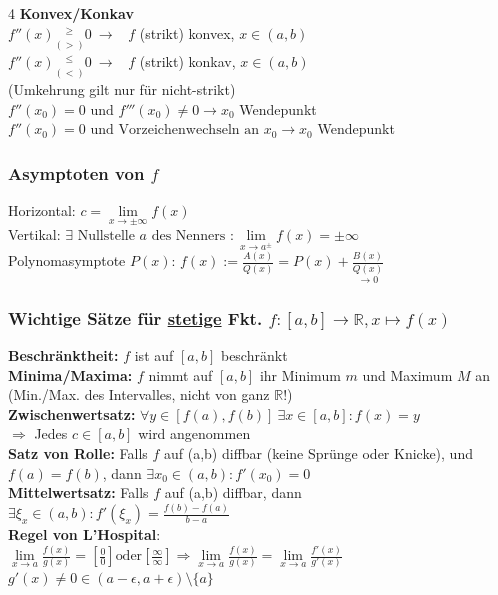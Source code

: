 \documentclass[6pt,a4paper]{scrartcl}
\newcommand{\ra}[0]{\ensuremath{\rightarrow}}
\begin{document}
\begin{multicols*}{4}
	\textbf{Konvex/Konkav} \\
	$f''(x) \underset{(>)}{^{\ge}} 0 \ \rightarrow$ \ $f$ (strikt) konvex, $x\in(a,b)$\\
	$f''(x) \underset{(<)}{^{\le}} 0 \ \rightarrow$ \ $f$ (strikt) konkav, $x\in(a,b)$\\
	(Umkehrung gilt nur für nicht-strikt) \\
	$f''(x_0)=0 \text{ und } f'''(x_0) \ne 0 \rightarrow x_0$ Wendepunkt \\
	$f''(x_0)=0 \text{ und Vorzeichenwechseln an } x_0 \rightarrow x_0$ Wendepunkt

	\subsubsection{Asymptoten von $f$}
	Horizontal: $c=\lim\limits_{x\ra \pm \infty} f(x)$\\
	Vertikal: $\exists \text{ Nullstelle } a \text{ des Nenners }: \lim\limits_{x \rightarrow a^{\pm}} f(x) = \pm \infty$\\
	Polynomasymptote $P(x)$: $f(x):=\frac{A(x)}{Q(x)}=P(x)+ \underset{\ra 0}{\frac{B(x)}{Q(x)}}$

	\begin{sectionbox}
		\subsubsection{Wichtige Sätze für \underline{stetige} Fkt. $f: [a,b] \rightarrow \mathbb R, x \mapsto f(x)$ }
		\textbf{Beschränktheit:} $f$ ist auf $[a,b]$ beschränkt\\
		\textbf{Minima/Maxima:} $f$ nimmt auf $[a,b]$ ihr Minimum $m$ und Maximum $M$ an (Min./Max. des Intervalles, nicht von ganz $\mathbb R$!)\\
		\textbf{Zwischenwertsatz:} $\forall y \in [f(a),f(b)]\ \exists x\in [a,b]:f(x)=y$\\
		$\Longrightarrow$ Jedes $c \in [a,b]$ wird angenommen\\
		\textbf{Satz von Rolle:} Falls $f$ auf (a,b) diffbar (keine Sprünge oder Knicke), und $f(a)=f(b)$, dann $\exists x_0 \in (a,b): f' (x_0) = 0$\\
		\textbf{Mittelwertsatz:} Falls $f$ auf (a,b) diffbar, dann $\exists \xi_x \in (a,b):f'(\xi_x)=\frac{f(b)-f(a)}{b-a}$\\
		\textbf{Regel von L'Hospital}:\\ $\lim\limits_{x \rightarrow a} \frac{f(x)}{g(x)} = \left[ \frac{0}{0} \right] \text{oder} \left[ \frac{\infty}{\infty} \right] \Rightarrow \lim\limits_{x \rightarrow a} \frac{f(x)}{g(x)} = \lim\limits_{x \rightarrow a} \frac{f'(x)}{g'(x)}$\\
		$g'(x) \ne 0 \in (a - \epsilon, a + \epsilon)\setminus \{a\}$
	\end{sectionbox}


\end{multicols*}
\end{document}
